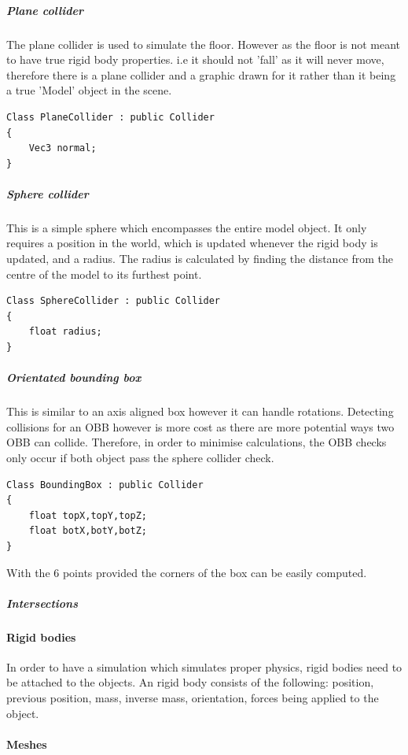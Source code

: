 \documentclass[conference,backref=page]{acmsiggraph}
\begin{document}
\subparagraph{Plane collider} \hfill

The plane collider is used to simulate the floor. However as the floor is not meant to have true rigid body properties. i.e it should not 'fall' as it will never move, therefore there is a plane collider and a graphic drawn for it rather than it being a true 'Model' object in the scene.

\begin{lstlisting}
Class PlaneCollider : public Collider
{
	Vec3 normal;
}
\end{lstlisting}

\subparagraph{Sphere collider}  \hfill 

This is a simple sphere which encompasses the entire model object. It only requires a position in the world, which is updated whenever the rigid body is updated, and a radius. The radius is calculated by finding the distance from the centre of the model to its furthest point. 

\begin{lstlisting}
Class SphereCollider : public Collider
{
	float radius;
}
\end{lstlisting}

\subparagraph{Orientated bounding box}\hfill 

This is similar to an axis aligned box however it can handle rotations. Detecting collisions for an OBB however is more cost as there are more potential ways two OBB can collide. Therefore, in order to minimise calculations, the OBB checks only occur if both object pass the sphere collider check. 

\begin{lstlisting}
Class BoundingBox : public Collider
{
	float topX,topY,topZ;
	float botX,botY,botZ;
}
\end{lstlisting}
With the 6 points provided the corners of the box can be easily computed.


\subparagraph{Intersections}


\paragraph{Rigid bodies} \hfill

In order to have a simulation which simulates proper physics, rigid bodies need to be attached to the objects. An rigid body consists of the following: position, previous position, mass, inverse mass, orientation, forces being applied to the object. 


\paragraph{Meshes}
\end{document}
